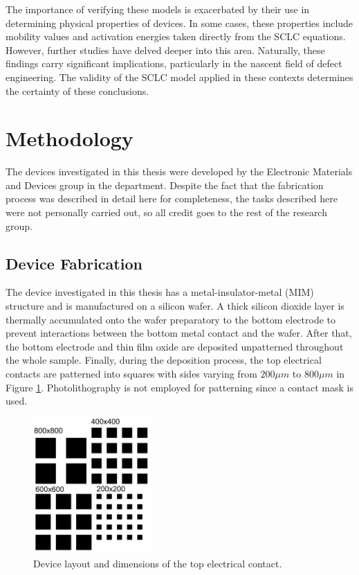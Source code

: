 \noindent The importance of verifying these models is exacerbated by their use in determining physical properties of devices. In some cases, these properties include mobility values and activation energies taken directly from the SCLC equations. However, further studies have delved deeper into this area. Naturally, these findings carry significant implications, particularly in the nascent field of defect engineering. The validity of the SCLC model applied in these contexts determines the certainty of these conclusions.

\section[Methodology]{Methodology}

The devices investigated in this thesis were developed by the Electronic Materials and Devices group in the department. Despite the fact that the fabrication process was described in detail here for completeness, the tasks described here were not personally carried out, so all credit goes to the rest of the research group.

\subsection[Device Fabrication]{Device Fabrication}

\noindent The device investigated in this thesis has a metal-insulator-metal (MIM) structure and is manufactured on a silicon wafer. A thick silicon dioxide layer is thermally accumulated onto the wafer preparatory to the bottom electrode to prevent interactions between the bottom metal contact and the wafer. After that, the bottom electrode and thin film oxide are deposited unpatterned throughout the whole sample. Finally, during the deposition process, the top electrical contacts are patterned into squares with sides varying from $200\mu m$ to $800\mu m$ in Figure \ref{fig:3c}. Photolithography is not employed for patterning since a contact mask is used. \\

\begin{figure}[htbp!] 
\centering    
\includegraphics[width=0.4\textwidth]{Chapter3/Figs/3c.png}
\caption[Device Structure]{Device layout and dimensions of the top electrical contact.}
\label{fig:3c}
\end{figure}

